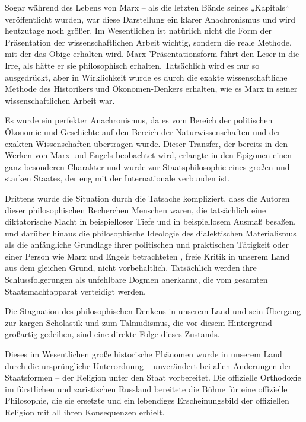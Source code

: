 \documentclass[11pt,a4paper]{book}
\begin{document}
Sogar während des Lebens von Marx -- als die letzten Bände seines „Kapitals“ veröffentlicht wurden, war diese Darstellung ein klarer Anachronismus und wird heutzutage noch größer. Im Wesentlichen ist natürlich nicht die Form der Präsentation der wissenschaftlichen Arbeit wichtig, sondern die reale Methode, mit der das Obige erhalten wird. Marx 'Präsentationsform führt den Leser in die Irre, als hätte er sie philosophisch erhalten. Tatsächlich wird es nur so ausgedrückt, aber in Wirklichkeit wurde es durch die exakte wissenschaftliche Methode des Historikers und Ökonomen-Denkers erhalten, wie es Marx in seiner wissenschaftlichen Arbeit war.



Es wurde ein perfekter Anachronismus, da es vom Bereich der politischen Ökonomie und Geschichte auf den Bereich der Naturwissenschaften und der exakten Wissenschaften übertragen wurde. Dieser Transfer, der bereits in den Werken von Marx und Engels beobachtet wird, erlangte in den Epigonen einen ganz besonderen Charakter und wurde zur Staatsphilosophie eines großen und starken Staates, der eng mit der Internationale verbunden ist.



Drittens wurde die Situation durch die Tatsache kompliziert, dass die Autoren dieser philosophischen Recherchen Menschen waren, die tatsächlich eine diktatorische Macht in beispielloser Tiefe und in beispiellosem Ausmaß besaßen, und darüber hinaus die philosophische Ideologie des dialektischen Materialismus als die anfängliche Grundlage ihrer politischen und praktischen Tätigkeit oder einer Person wie Marx und Engels betrachteten , freie Kritik in unserem Land aus dem gleichen Grund, nicht vorbehaltlich. Tatsächlich werden ihre Schlussfolgerungen als unfehlbare Dogmen anerkannt, die vom gesamten Staatsmachtapparat verteidigt werden.



Die Stagnation des philosophischen Denkens in unserem Land und sein Übergang zur kargen Scholastik und zum Talmudismus, die vor diesem Hintergrund großartig gedeihen, sind eine direkte Folge dieses Zustands.



Dieses im Wesentlichen große historische Phänomen wurde in unserem Land durch die ursprüngliche Unterordnung -- unverändert bei allen Änderungen der Staatsformen -- der Religion unter den Staat vorbereitet. Die offizielle Orthodoxie im fürstlichen und zaristischen Russland bereitete die Bühne für eine offizielle Philosophie, die sie ersetzte und ein lebendiges Erscheinungsbild der offiziellen Religion mit all ihren Konsequenzen erhielt.
\end{document}
